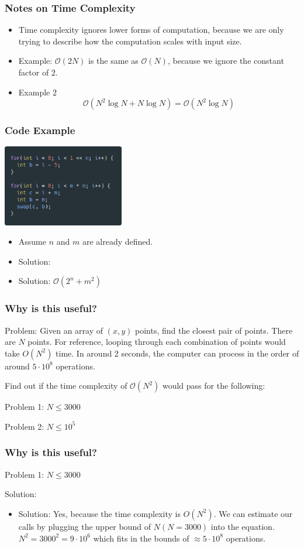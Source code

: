\documentclass{beamer}
\begin{document}
\begin{frame}
	\frametitle{Notes on Time Complexity}
	\begin{itemize}
		\item Time complexity ignores lower forms of computation, because we are
		only trying to describe how the computation scales with input size.
		\item Example: $\mathcal{O}(2N)$ is the same as $\mathcal{O}(N)$, because we ignore the constant
		factor of $2$.
		\item Example 2
		$$\mathcal{O}(N^2\log N + N\log N) = \mathcal{O}(N^2\log N)$$
	\end{itemize}
\end{frame}

\begin{frame}
	\frametitle{Code Example}
	\begin{center}
		\includegraphics[width=200px]{2021-08-31-14-09-51.png}
	\end{center}
	\begin{itemize}
		\item<1-> Assume $n$ and $m$ are already defined.
		\item<2-> Solution:
		\item<3-> Solution: $\mathcal{O}(2^n + m^2)$
	\end{itemize}
\end{frame}

\begin{frame}
	\frametitle{Why is this useful?}
	Problem: Given an array of $(x, y)$ points, find the closest pair of points.
	There are $N$ points. For reference, looping through each combination of
	points would take $O(N^2)$ time. In around 2 seconds, the computer can process
	in the order of around $5\cdot 10^8$ operations.

	Find out if the time complexity of $\mathcal{O}(N^2)$ would pass for the following:
	
	Problem 1: $N \leq 3000$

	Problem 2: $N \leq 10^5$
\end{frame}

\begin{frame}
	\frametitle{Why is this useful?}

	Problem 1: $N \leq 3000$

	Solution:

	\begin{itemize}
		\item<2-> Solution: Yes, because the time complexity is $O(N^2)$.
		We can estimate our calls by plugging the upper bound of $N(N = 3000)$
		into the equation. $N^2 = 3000^2 = 9\cdot 10^6$ which fits in the bounds
		of $\approx 5\cdot 10^8$ operations.
	\end{itemize}
\end{frame}
\end{document}
